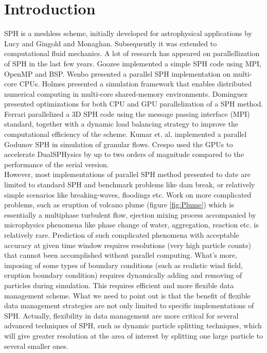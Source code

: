 \documentclass[conference,compsoc]{IEEEtran}
\begin{document}
\section{Introduction}
SPH is a meshless scheme, initially developed for astrophysical applications by Lucy\cite{lucy1977numerical} and Gingold and Monaghan\cite{gingold1977smoothed}. 
Subsequently it was extended to computational fluid mechanics. 
A lot of research has appeared  on  parallellization of SPH in the last few years. 
Goozee\cite{goozee2003distributed} implemented a simple SPH code using MPI, OpenMP and BSP. 
Wenbo\cite{wenbo2014performance} presented a parallel SPH implementation on multi-core CPUs. 
Holmes\cite{holmes2011framework} presented a simulation framework that enables distributed numerical computing in multi-core shared-memory environments. 
Dominguez\cite{dominguez2011optimization} presented optimizations for both CPU and GPU parallelization of a SPH method. 
Ferrari\cite{ferrari2009new} parallelized a 3D SPH code using the message passing interface (MPI) standard, together with a dynamic load balancing strategy to improve the computational efficiency of the scheme. 
Kumar et. al. \cite{kumar2013parallel} implemented a parallel Godunov SPH in simulation of granular flows.
Crespo\cite{crespo2015dualsphysics} used the GPUs to accelerate DualSPHysics by up to two orders of magnitude compared to the performance of the serial version.\\
However, most implementations of parallel SPH method presented to date are limited to standard SPH and benchmark problems like dam break, or relatively
simple scenarios like breaking-waves, floodings etc. Work on more complicated problems, such as eruption of volcano plume (figure \ref{fig:Plume}) which is essentially a multiphase turbulent flow,
ejection mixing process accompanied by microphysics phenomena like phase change of water, aggregation, reaction etc. is relatively rare. 
Prediction of such complicated phenomena with acceptable accuracy at given time window requires resolutions (very high particle counts) that cannot been accomplished without parallel computing. What's more, imposing of some types of boundary conditions (such as realistic wind field, eruption boundary condition) requires dynamically adding and removing of particles during simulation. This requires efficient and more flexible data management scheme. What we need to point out is that the benefit of flexible data management strategies are not only limited to specific implementations of SPH. Actually, flexibility in data management are more critical for several advanced techniques of SPH, such as dynamic particle splitting techniques\cite{vacondio2012accurate, feldman2007dynamic}, which will give greater resolution at the area of interest by splitting one large particle to several smaller ones.
\end{document}

